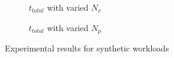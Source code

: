 \begin{figure}
\begin{subfigure}{0.30\textwidth}
        \caption{$t_{total}$ with varied $N_v$}
        \label{fig:stress_test_view_num}
    \end{subfigure}
    \hfill
    \begin{subfigure}{0.30\textwidth}
    \hspace*{-0.8cm}
        \caption{$t_{total}$ with varied $N_p$}
        \label{fig:stress_test_predicate_num_time}
    \end{subfigure}
    \caption{Experimental results for synthetic workloads}
\end{figure}

